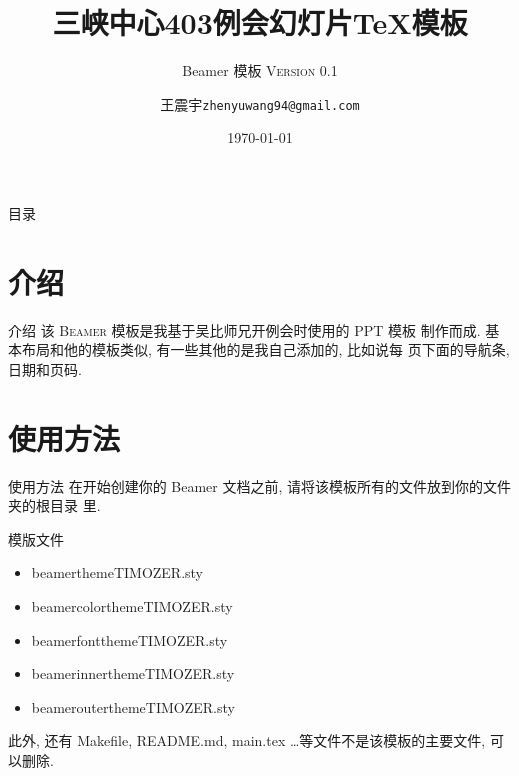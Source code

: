 \documentclass[no-math]{beamer}
\title{三峡中心403例会幻灯片\TeX{}模板}
\subtitle{\LaTeXe{} Beamer 模板 \textsc{Version 0.1}}
\date{\today}
\author{王震宇\quad \texttt{zhenyuwang94@gmail.com}}
\institute{计算机学院}
\begin{document}
    \begin{frame}
        \titlepage
    \end{frame}
    \begin{frame}{目录}
        \tableofcontents
    \end{frame}
    
    \section{介绍}
    \begin{frame}{介绍}
        该 \LaTeXe{} \textsc{Beamer} 模板是我基于吴比师兄开例会时使用的 PPT 模板
        制作而成. 基本布局和他的模板类似, 有一些其他的是我自己添加的, 比如说每
        页下面的导航条, 日期和页码.

    \end{frame}
    \section{使用方法}
        \begin{frame}{使用方法}
            在开始创建你的 Beamer 文档之前, 请将该模板所有的文件放到你的文件夹的根目录
            里.
            \begin{block}{模版文件}
                \begin{itemize}
                    \item beamerthemeTIMOZER.sty
                    \item beamercolorthemeTIMOZER.sty
                    \item beamerfontthemeTIMOZER.sty
                    \item beamerinnerthemeTIMOZER.sty
                    \item beamerouterthemeTIMOZER.sty
                \end{itemize}
            \end{block}
            此外, 还有 Makefile, README.md, main.tex \ldots 等文件不是该模板的主要文件,
            可以删除.
        \end{frame}
\end{document}
